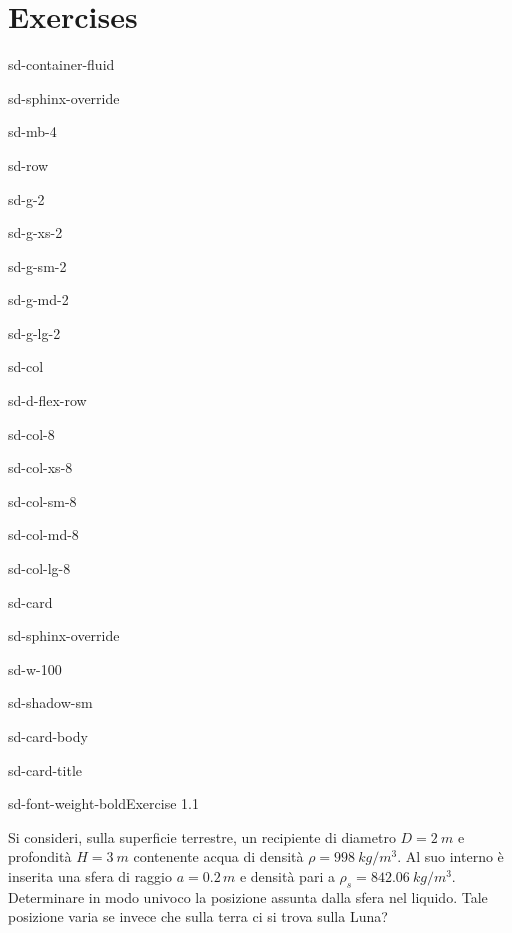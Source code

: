 \documentclass[letterpaper,10pt,italian]{jupyterBook}
\begin{document}
\section{Exercises}
\label{\detokenize{polimi/fluidmechanics-ita/template/capitoli/01_statica/exercises:exercises}}\label{\detokenize{polimi/fluidmechanics-ita/template/capitoli/01_statica/exercises:fluid-mechanics-statics-exercises}}\label{\detokenize{polimi/fluidmechanics-ita/template/capitoli/01_statica/exercises::doc}}
\begin{sphinxuseclass}{sd-container-fluid}
\begin{sphinxuseclass}{sd-sphinx-override}
\begin{sphinxuseclass}{sd-mb-4}
\begin{sphinxuseclass}{sd-row}
\begin{sphinxuseclass}{sd-g-2}
\begin{sphinxuseclass}{sd-g-xs-2}
\begin{sphinxuseclass}{sd-g-sm-2}
\begin{sphinxuseclass}{sd-g-md-2}
\begin{sphinxuseclass}{sd-g-lg-2}
\begin{sphinxuseclass}{sd-col}
\begin{sphinxuseclass}{sd-d-flex-row}
\begin{sphinxuseclass}{sd-col-8}
\begin{sphinxuseclass}{sd-col-xs-8}
\begin{sphinxuseclass}{sd-col-sm-8}
\begin{sphinxuseclass}{sd-col-md-8}
\begin{sphinxuseclass}{sd-col-lg-8}
\begin{sphinxuseclass}{sd-card}
\begin{sphinxuseclass}{sd-sphinx-override}
\begin{sphinxuseclass}{sd-w-100}
\begin{sphinxuseclass}{sd-shadow-sm}
\begin{sphinxuseclass}{sd-card-body}
\begin{sphinxuseclass}{sd-card-title}
\begin{sphinxuseclass}{sd-font-weight-bold}Exercise 1.1
\end{sphinxuseclass}
\end{sphinxuseclass}
\sphinxAtStartPar
Si consideri, sulla superficie terrestre, un recipiente di diametro \(D=2 \ m\) e profondità \(H=3\  m\) contenente acqua di densità \(\rho = 998\ kg / m^3\). Al suo interno è inserita una sfera di raggio \(a=0.2\, m\) e densità pari a \(\rho_s=842.06\ kg / m^3\).
Determinare in modo univoco la posizione assunta dalla sfera nel liquido. Tale posizione varia se invece che sulla terra ci si trova sulla Luna?


\end{sphinxuseclass}
\end{sphinxuseclass}
\end{sphinxuseclass}
\end{sphinxuseclass}
\end{sphinxuseclass}
\end{sphinxuseclass}
\end{sphinxuseclass}
\end{sphinxuseclass}
\end{sphinxuseclass}
\end{sphinxuseclass}
\end{sphinxuseclass}
\end{sphinxuseclass}
\end{sphinxuseclass}
\end{sphinxuseclass}
\end{sphinxuseclass}
\end{sphinxuseclass}
\end{sphinxuseclass}
\end{sphinxuseclass}
\end{sphinxuseclass}
\end{sphinxuseclass}
\end{sphinxuseclass}
\end{document}
